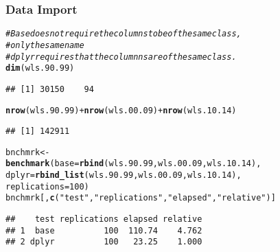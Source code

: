 \documentclass{beamer}\usepackage[]{graphicx}\usepackage[]{color}
\makeatletter
\newcommand{\hlnum}[1]{\textcolor[rgb]{0.686,0.059,0.569}{#1}}%
\newcommand{\hlstr}[1]{\textcolor[rgb]{0.192,0.494,0.8}{#1}}%
\newcommand{\hlcom}[1]{\textcolor[rgb]{0.678,0.584,0.686}{\textit{#1}}}%
\newcommand{\hlopt}[1]{\textcolor[rgb]{0,0,0}{#1}}%
\newcommand{\hlstd}[1]{\textcolor[rgb]{0.345,0.345,0.345}{#1}}%
\newcommand{\hlkwb}[1]{\textcolor[rgb]{0.69,0.353,0.396}{#1}}%
\newcommand{\hlkwc}[1]{\textcolor[rgb]{0.333,0.667,0.333}{#1}}%
\newcommand{\hlkwd}[1]{\textcolor[rgb]{0.737,0.353,0.396}{\textbf{#1}}}%
\newenvironment{kframe}{%
 \def\at@end@of@kframe{}%
 \ifinner\ifhmode%
  \def\at@end@of@kframe{\end{minipage}}%
  \begin{minipage}{\columnwidth}%
 \fi\fi%
 \def\FrameCommand##1{\hskip\@totalleftmargin \hskip-\fboxsep
 \colorbox{shadecolor}{##1}\hskip-\fboxsep
     \hskip-\linewidth \hskip-\@totalleftmargin \hskip\columnwidth}%
 \MakeFramed {\advance\hsize-\width
   \@totalleftmargin\z@ \linewidth\hsize
   \@setminipage}}%
 {\par\unskip\endMakeFramed%
 \at@end@of@kframe}
\newenvironment{knitrout}{}{} %
\makeatother
\begin{document}
\begin{frame}[fragile]
  \frametitle{Data Import}
\begin{knitrout}\footnotesize
{}\color{fgcolor}\begin{kframe}
\begin{alltt}
\hlcom{# Base does not require the columns to be of the same class,}
\hlcom{# only the same name}
\hlcom{# dplyr requires that the columnns are of the same class.}
\hlkwd{dim}\hlstd{(wls.90.99)}
\end{alltt}
\begin{verbatim}
## [1] 30150    94
\end{verbatim}
\begin{alltt}
\hlkwd{nrow}\hlstd{(wls.90.99)} \hlopt{+} \hlkwd{nrow}\hlstd{(wls.00.09)} \hlopt{+} \hlkwd{nrow}\hlstd{(wls.10.14)}
\end{alltt}
\begin{verbatim}
## [1] 142911
\end{verbatim}
\begin{alltt}
\hlstd{bnchmrk} \hlkwb{<-}
  \hlkwd{benchmark}\hlstd{(}\hlkwc{base} \hlstd{=} \hlkwd{rbind}\hlstd{(wls.90.99, wls.00.09, wls.10.14),}
            \hlkwc{dplyr} \hlstd{=} \hlkwd{rbind_list}\hlstd{(wls.90.99, wls.00.09, wls.10.14),}
            \hlkwc{replications} \hlstd{=} \hlnum{100}\hlstd{)}
\hlstd{bnchmrk[,} \hlkwd{c}\hlstd{(}\hlstr{"test"}\hlstd{,} \hlstr{"replications"}\hlstd{,} \hlstr{"elapsed"}\hlstd{,} \hlstr{"relative"}\hlstd{)]}
\end{alltt}
\begin{verbatim}
##    test replications elapsed relative
## 1  base          100  110.74    4.762
## 2 dplyr          100   23.25    1.000
\end{verbatim}
\end{kframe}
\end{knitrout}
\end{frame} 
\end{document}
